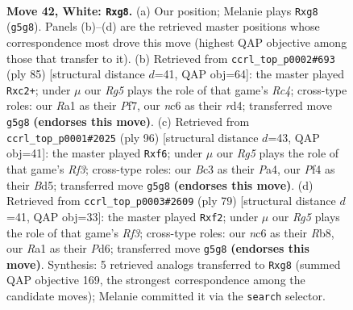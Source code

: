 \documentclass[11pt]{article}
\begin{document}
\clearpage

\begin{figure}[p]\centering
\begin{subfigure}{0.46\textwidth}\centering
\resizebox{\linewidth}{!}{%
\newchessgame
\chessboard[
  setfen={6r1/5k1r/p1n5/6R1/1P3P2/2B5/P3b1K1/R7 w - - 17 42},
  showmover=false,
  pgfstyle=straightmove, color=movearrow, markmove={g5-g8}
]}
\caption{}
\end{subfigure}\hfill
\begin{subfigure}{0.46\textwidth}\centering
\resizebox{\linewidth}{!}{%
\newchessgame
\chessboard[
  setfen={8/2k2pp1/4b3/2r5/3R2p1/6P1/2R4P/2K5 b - - 14 43},
  showmover=false,
  pgfstyle=straightmove, color=movearrow, markmove={c5-c2}
]}
\caption{}
\end{subfigure}
\\[4pt]
\begin{subfigure}{0.46\textwidth}\centering
\resizebox{\linewidth}{!}{%
\newchessgame
\chessboard[
  setfen={8/6k1/1b3r2/3Bp2P/Pp6/5R2/5PK1/8 w - - 5 49},
  showmover=false,
  pgfstyle=straightmove, color=movearrow, markmove={f3-f6}
]}
\caption{}
\end{subfigure}\hfill
\begin{subfigure}{0.46\textwidth}\centering
\resizebox{\linewidth}{!}{%
\newchessgame
\chessboard[
  setfen={1r6/8/2Bp1r2/1P4k1/3p4/7b/5R2/4R1K1 b - - 1 40},
  showmover=false,
  pgfstyle=straightmove, color=movearrow, markmove={f6-f2}
]}
\caption{}
\end{subfigure}
\caption{\textbf{Move 42, White: \texttt{Rxg8}.} (a) Our position; Melanie plays \texttt{Rxg8} (\texttt{g5g8}). Panels (b)--(d) are the retrieved master positions whose correspondence most drove this move (highest QAP objective among those that transfer to it). (b) Retrieved from \texttt{ccrl\_top\_p0002\#693} (ply 85) [structural distance $d$=41, QAP obj=64]: the master played \texttt{Rxc2+}; under $\mu$ our \emph{Rg5} plays the role of that game's \emph{Rc4}; cross-type roles: our \emph{R}a1 as their \emph{P}f7, our \emph{n}c6 as their \emph{r}d4; transferred move \texttt{g5g8} \textbf{(endorses this move)}. (c) Retrieved from \texttt{ccrl\_top\_p0001\#2025} (ply 96) [structural distance $d$=43, QAP obj=41]: the master played \texttt{Rxf6}; under $\mu$ our \emph{Rg5} plays the role of that game's \emph{Rf3}; cross-type roles: our \emph{B}c3 as their \emph{P}a4, our \emph{P}f4 as their \emph{B}d5; transferred move \texttt{g5g8} \textbf{(endorses this move)}. (d) Retrieved from \texttt{ccrl\_top\_p0003\#2609} (ply 79) [structural distance $d$=41, QAP obj=33]: the master played \texttt{Rxf2}; under $\mu$ our \emph{Rg5} plays the role of that game's \emph{Rf3}; cross-type roles: our \emph{n}c6 as their \emph{R}b8, our \emph{R}a1 as their \emph{P}d6; transferred move \texttt{g5g8} \textbf{(endorses this move)}. Synthesis: 5 retrieved analogs transferred to \texttt{Rxg8} (summed QAP objective 169, the strongest correspondence among the candidate moves); Melanie committed it via the \texttt{search} selector.}
\label{fig:thought-m82}
\end{figure}
\end{document}
